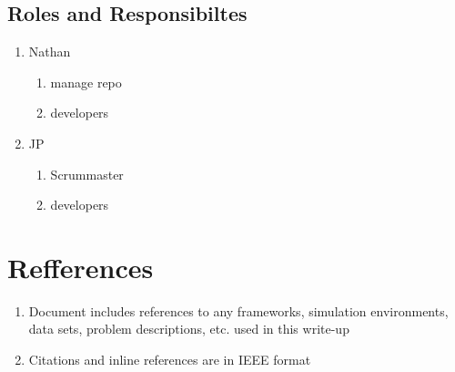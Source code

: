 \documentclass[11pt]{article}
\begin{document}
\subsection{Roles and Responsibiltes}
\begin{enumerate}
\item Nathan
  \begin{enumerate}
  \item manage repo
  \item developers
  \end{enumerate}
\item JP
  \begin{enumerate}
    \item Scrummaster
    \item developers
  \end{enumerate}
\end{enumerate}

\section{Refferences}
\begin{enumerate}
\item Document includes references to any frameworks, simulation environments, data sets, problem descriptions,
  etc. used in this write-up
\item Citations and inline references are in IEEE format
\end{enumerate}
\printbibliography
\end{document}
